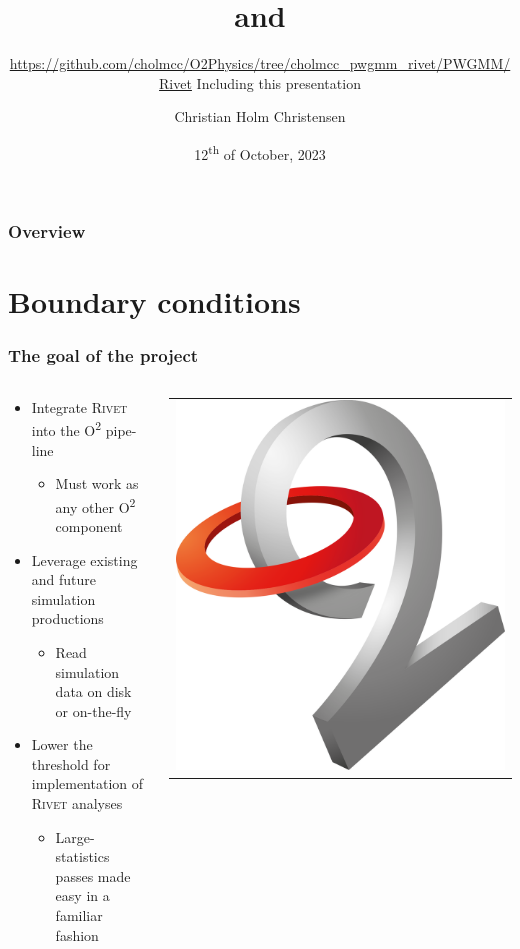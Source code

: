 \documentclass[compress,table,8pt]{beamer}
\title{\ALICE{} \Otwo{} and \Rivet}%
\subtitle{\url{https://github.com/cholmcc/O2Physics/tree/cholmcc_pwgmm_rivet/PWGMM/Rivet}\newline%
  {\footnotesize Including this presentation}}
\author[C.H.Christensen]{Christian Holm Christensen}
\institute{\inst{1}Niels Bohr Institute}
\date[12.~Oct, 2023]{12\textsuperscript{th} of October, 2023}
\newcommand\Rivet{{\scshape Rivet}}
\newcommand\Otwo{O\textsuperscript{2}}
\begin{document}
\aliceTitlePage{}
\begin{frame}
  \frametitle{Overview}
  \Overview{}
\end{frame}
\section{Boundary conditions}
\begin{frame}
  \frametitle{The goal of the project}
  \begin{columns}
    \begin{column}{.7\linewidth}
      \begin{itemize}
      \item<+-> Integrate \Rivet{} into the \ALICE{} \Otwo{} pipe-line
        \begin{itemize}
        \item Must work as any other \Otwo{} component
        \end{itemize}
      \item<+-> Leverage existing and future simulation productions
        \begin{itemize}
        \item Read simulation data on disk or on-the-fly
        \end{itemize}
      \item<+-> Lower the threshold for implementation of \ALICE{}
        \Rivet{} analyses
        \begin{itemize}
        \item Large-statistics passes made easy in a familiar fashion
        \end{itemize}
      \end{itemize}
    \end{column}
    \begin{column}{.25\linewidth}
      \begin{tabular}{c}
        \includegraphics[width=.8\linewidth]{o2}\\

\end{tabular}
\end{column}
\end{columns}
\end{frame}
\end{document}

